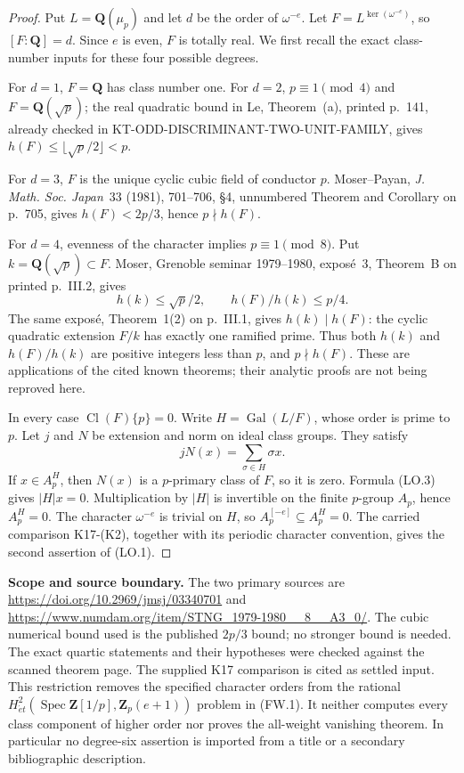 \documentclass[11pt,a4paper]{article}
\theoremstyle{definition}
\renewcommand{\paragraph}[1]{\par\smallskip\noindent\textbf{#1}\quad\ignorespaces}
\begin{document}
\begin{proof}
Put $L=\mathbf Q(\mu_p)$ and let $d$ be the order of
$\omega^{-e}$. Let $F=L^{\ker(\omega^{-e})}$, so
$[F:\mathbf Q]=d$. Since $e$ is even, $F$ is totally real.
We first recall the exact class-number inputs for these four
possible degrees.

For $d=1$, $F=\mathbf Q$ has class number one. For $d=2$,
$p\equiv1\pmod4$ and $F=\mathbf Q(\sqrt p)$; the real
quadratic bound in Le, Theorem~(a), printed p.~141, already
checked in KT-ODD-DISCRIMINANT-TWO-UNIT-FAMILY, gives
$h(F)\le\lfloor\sqrt p/2\rfloor<p$.

For $d=3$, $F$ is the unique cyclic cubic field of conductor
$p$. Moser--Payan, \emph{J. Math. Soc. Japan}~33 (1981),
701--706, \S4, unnumbered Theorem and Corollary on p.~705,
gives $h(F)<2p/3$, hence $p\nmid h(F)$.

For $d=4$, evenness of the character implies
$p\equiv1\pmod8$. Put $k=\mathbf Q(\sqrt p)\subset F$.
Moser, Grenoble seminar 1979--1980, expos\'e~3,
Theorem~B on printed p.~III.2, gives
\[
            h(k)\le\sqrt p/2,\qquad h(F)/h(k)\le p/4.  \tag{LO.2}
\]
The same expos\'e, Theorem~1(2) on p.~III.1, gives
$h(k)\mid h(F)$: the cyclic quadratic extension $F/k$
has exactly one ramified prime. Thus both $h(k)$ and
$h(F)/h(k)$ are positive integers less than $p$, and
$p\nmid h(F)$. These are applications of the cited known
theorems; their analytic proofs are not being reproved here.

In every case $\operatorname{Cl}(F)\{p\}=0$.
Write $H=\operatorname{Gal}(L/F)$, whose order is prime to
$p$. Let $j$ and $N$ be extension and norm on ideal class
groups. They satisfy
\[
                      jN(x)=\sum_{\sigma\in H}\sigma x.
                                                               \tag{LO.3}
\]
If $x\in A_p^H$, then $N(x)$ is a $p$-primary class of $F$,
so it is zero. Formula (LO.3) gives $|H|x=0$.
Multiplication by $|H|$ is invertible on the finite $p$-group
$A_p$, hence $A_p^H=0$. The character $\omega^{-e}$ is
trivial on $H$, so $A_p^{[-e]}\subseteq A_p^H=0$.
The carried comparison K17-(K2), together with its periodic
character convention, gives the second assertion of (LO.1).
\end{proof}

\paragraph{Scope and source boundary.}
The two primary sources are
\url{https://doi.org/10.2969/jmsj/03340701} and
\url{https://www.numdam.org/item/STNG_1979-1980__8__A3_0/}.
The cubic numerical bound used is the published $2p/3$ bound;
no stronger bound is needed. The exact quartic statements and
their hypotheses were checked against the scanned theorem page.
The supplied K17 comparison is cited as settled input.
This restriction removes the specified character orders from
the rational $H^2_{\acute et}(\operatorname{Spec}\mathbf Z[1/p],
\mathbf Z_p(e+1))$ problem in (FW.1). It neither computes every
class component of higher order nor proves the all-weight
vanishing theorem. In particular no degree-six assertion is
imported from a title or a secondary bibliographic description.
\end{document}
